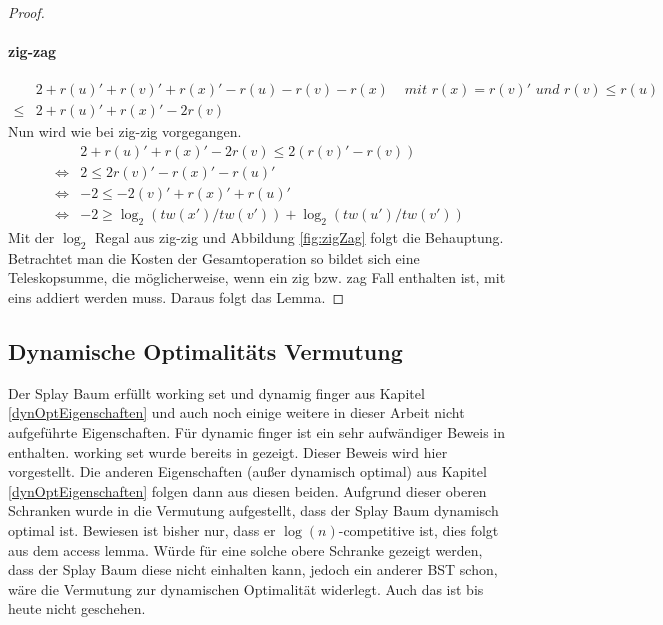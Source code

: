 \documentclass[a4paper,12pt]{article}
\begin{document}
\begin{proof}
	\paragraph{zig-zag} 
	\begin{align*}
	&2 + r\left(u\right)' +r\left(v\right)' +r\left(x\right)' - r\left(u\right)- r\left(v\right)- r\left(x\right) &\textit{ mit $r\left(x\right) =  r\left(v\right)'$ und $r\left(v\right) \leq  r\left(u\right)$} \\
	\leq& 2 + r\left(u\right)' +r\left(x\right)' - 2 r\left(v\right)
	\end{align*}
	Nun wird wie bei zig-zig vorgegangen.
	\begin{align*}
	&  2 + r\left(u\right)' +r\left(x\right)' - 2 r\left(v\right) \leq  2\left(r\left(v\right)'- r\left(v\right)\right)\\
	\Leftrightarrow &2 \leq 2r\left(v\right)' -  r\left(x\right)' - r\left(u\right)'\\
	\Leftrightarrow &-2 \leq -2\left(v\right)' +  r\left(x\right)' + r\left(u\right)'\\
	\Leftrightarrow & -2 \geq \log_2\left(\mathit{tw}\left(x'\right) / \mathit{tw}\left(v'\right)\right) + \log_2\left(\mathit{tw}\left(u'\right) / \mathit{tw}\left(v'\right)\right)
	\end{align*}
	Mit der $\log_2$ Regal aus zig-zig und Abbildung \ref{fig:zigZag} folgt die Behauptung.
	Betrachtet man die Kosten der Gesamtoperation so bildet sich eine Teleskopsumme, die möglicherweise, wenn ein  zig bzw. zag Fall enthalten ist, mit eins addiert werden muss. Daraus folgt das Lemma.
\end{proof}

\subsection{Dynamische Optimalitäts Vermutung}
Der Splay Baum erfüllt working set und dynamig finger aus Kapitel \ref{dynOptEigenschaften} und auch noch einige weitere in dieser Arbeit nicht aufgeführte Eigenschaften. Für dynamic finger ist ein sehr aufwändiger Beweis in \cite{dynFInger} enthalten. working set wurde bereits in \cite{splay} gezeigt. Dieser Beweis wird hier vorgestellt. Die anderen Eigenschaften (außer dynamisch optimal) aus Kapitel \ref{dynOptEigenschaften} folgen dann aus diesen beiden. Aufgrund dieser oberen Schranken wurde in \cite{splay} die Vermutung aufgestellt, dass der Splay Baum dynamisch optimal ist. Bewiesen ist bisher nur, dass er $\log \left(n\right)$-competitive ist, dies folgt aus dem access lemma. Würde für eine solche obere Schranke gezeigt werden, dass der Splay Baum diese nicht einhalten kann, jedoch ein anderer BST schon, wäre die Vermutung zur dynamischen Optimalität widerlegt. Auch das ist bis heute nicht geschehen. 
\end{document}
